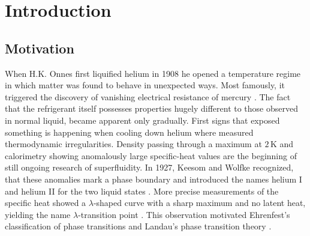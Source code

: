 \chapter{Introduction}
\label{ch:introduction}


\section{Motivation}
\label{sec:motivation}
When H.K. Onnes first liquified helium in 1908 \cite{onnesLiquefactionHelium1991} he opened a temperature regime in which matter was found to behave in unexpected ways. Most famously, it triggered the discovery of vanishing electrical resistance of mercury \cite{onnesMeasurementKnowledge1990}. The fact that the refrigerant itself possesses properties hugely different to those observed in normal liquid, became apparent only gradually. First signs that exposed something is happening when cooling down helium where measured thermodynamic irregularities. Density passing through a maximum at $2\,\mathrm{K}$ and calorimetry showing anomalously large specific-heat values \cite{onnesMeasurementKnowledge1990} are the beginning of still ongoing research of superfluidity. In 1927, Keesom and Wolfke recognized, that these anomalies mark a phase boundary and introduced the names helium I and helium II for the two liquid states \cite{keesomTWODIFFERENTLIQUID1971}. More precise measurements of the specific heat showed a $\lambda$-shaped curve with a sharp maximum and no latent heat, yielding the name $\lambda$-transition point \cite{keesomNewMeasurementsSpecific1935a}. This observation motivated Ehrenfest's classification of phase transitions and Landau's phase transition theory \cite{terhaar17THEORYSPECIFIC1965}. 

